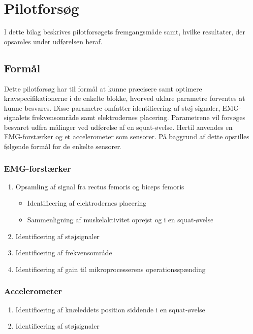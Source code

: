 \section{Pilotforsøg}
I dette bilag beskrives pilotforsøgets fremgangsmåde samt, hvilke resultater, der opsamles under udførelsen heraf. 

\subsection{Formål}
Dette pilotforsøg har til formål at kunne præcisere samt optimere kravspecifikationerne i de enkelte blokke, hvorved uklare parametre forventes at kunne besvares. Disse parametre omfatter identificering af støj signaler, EMG-signalets frekvensområde samt elektrodernes placering. Parametrene vil forsøges besvaret udfra målinger ved udførelse af en squat-øvelse.
Hertil anvendes en EMG-forstærker og et accelerometer som sensorer. På baggrund af dette opstilles følgende formål for de enkelte sensorer.  

\subsubsection{EMG-forstærker}
\begin{enumerate}
\item Opsamling af signal fra rectus femoris og biceps femoris
\begin{itemize}
\item Identificering af elektrodernes placering
\item Sammenligning af muskelaktivitet oprejst og i en squat-øvelse 
\end{itemize}
\item Identificering af støjsignaler
\item Identificering af frekvensområde
\item Identificering af gain til mikroprocesserens operationsspænding
\end{enumerate}

\subsubsection{Accelerometer}
\begin{enumerate}
\item Identificering af knæleddets position siddende i en squat-øvelse
\item Identificering af støjsignaler
\end{enumerate}

